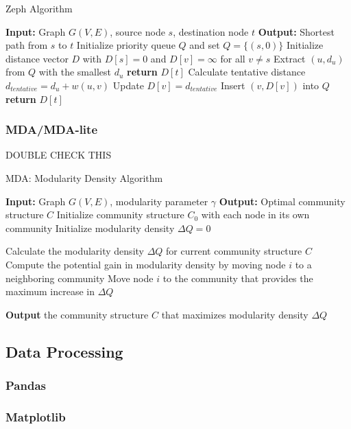 \begin{algorithm}
\caption{Zeph Algorithm}\label{alg:zeph}
\begin{algorithmic}[1]
\State \textbf{Input:} Graph $G(V, E)$, source node $s$, destination node $t$
\State \textbf{Output:} Shortest path from $s$ to $t$
\State Initialize priority queue $Q$ and set $Q = \{(s, 0)\}$
\State Initialize distance vector $D$ with $D[s] = 0$ and $D[v] = \infty$ for all $v \neq s$
    \State Extract $(u, d_u)$ from $Q$ with the smallest $d_u$
        \State \textbf{return} $D[t]$
    \EndIf
        \State Calculate tentative distance $d_{tentative} = d_u + w(u, v)$
            \State Update $D[v] = d_{tentative}$
            \State Insert $(v, D[v])$ into $Q$
        \EndIf
    \EndFor
\EndWhile
\State \textbf{return} $D[t]$ 
\end{algorithmic}
\end{algorithm}

\subsubsection{ MDA/MDA-lite}

DOUBLE CHECK THIS
\begin{algorithm}
\caption{MDA: Modularity Density Algorithm}\label{alg:mda}
\begin{algorithmic}[1]
\State \textbf{Input:} Graph $G(V, E)$, modularity parameter $\gamma$
\State \textbf{Output:} Optimal community structure $C$
\State Initialize community structure $C_0$ with each node in its own community
\State Initialize modularity density $\Delta Q = 0$

\Repeat
    \State Calculate the modularity density $\Delta Q$ for current community structure $C$
        \State Compute the potential gain in modularity density by moving node $i$ to a neighboring community
            \State Move node $i$ to the community that provides the maximum increase in $\Delta Q$
        \EndIf
    \EndFor
{}

\State \textbf{Output} the community structure $C$ that maximizes modularity density $\Delta Q$
\end{algorithmic}
\end{algorithm}

\newpage

\subsection{Data Processing}

\subsubsection{Pandas}

\subsubsection{Matplotlib}
